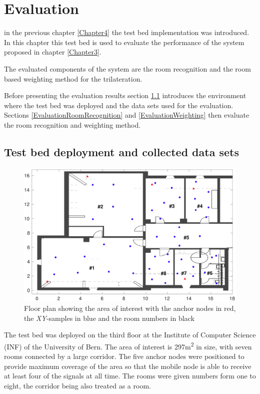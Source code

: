 \chapter{Evaluation}
\newcommand{\rd}[1]{\textcolor{red}{#1}}
\newcommand{\gn}[1]{\textcolor{green}{#1}}

\label{Chapter5}

in the previous chapter \ref{Chapter4} the test bed implementation was introduced. In this chapter this test bed is used to evaluate the performance of the system proposed in chapter \ref{Chapter3}.

The evaluated components of the system are the room recognition and the room based weighting method for the trilateration.

Before presenting the evaluation results section \ref{TestBedDeployment} introduces the environment where the test bed was deployed and the data sets used for the evaluation. Sections \ref{EvaluationRoomRecognition} and \ref{EvaluationWeighting} then evaluate the room recognition and weighting method.

\section{Test bed deployment and collected data sets}
\label{TestBedDeployment}

\begin{figure}[ht]
\centering
\includegraphics[width=\textwidth]{Figures/FloorPlan_ANs}
\decoRule
\caption[Floor plan]{Floor plan showing the area of interest with the anchor nodes in red, the \emph{XY}-samples in blue and the room numbers in black}
\label{fig:FloorPlanANs}
\end{figure}

The test bed was deployed on the third floor at the Institute of Computer Science (INF) of the University of Bern. The area of interest is 297m\textsuperscript{2} in size, with seven rooms connected by a large corridor. The five anchor nodes were positioned to provide maximum coverage of the area so that the mobile node is able to receive at least four of the signals at all time. The rooms were given numbers form one to eight, the corridor being also treated as a room.

